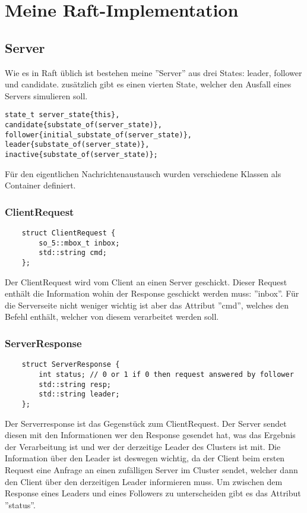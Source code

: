 \chapter{Meine Raft-Implementation}

\vspace{10mm}

\section{Server}
Wie es in Raft üblich ist bestehen meine ''Server'' aus drei States: leader, follower und candidate.
zusätzlich gibt es einen vierten State, welcher den Ausfall eines Servers simulieren soll.

\begin{verbatim}
state_t server_state{this},
candidate{substate_of(server_state)},
follower{initial_substate_of(server_state)},
leader{substate_of(server_state)},
inactive{substate_of(server_state)};
\end{verbatim}

Für den eigentlichen Nachrichtenaustausch wurden verschiedene Klassen als Container definiert.

\subsection{ClientRequest}
\begin{verbatim}
    struct ClientRequest {
        so_5::mbox_t inbox;
        std::string cmd;
    };
\end{verbatim}
Der ClientRequest wird vom Client an einen Server geschickt. Dieser Request enthält die Information
wohin der Response geschickt werden muss: ''inbox''. Für die Serverseite nicht weniger wichtig ist
aber das Attribut ''cmd'', welches den Befehl enthält, welcher von diesem verarbeitet werden soll.

\subsection{ServerResponse}
\begin{verbatim}
    struct ServerResponse {
        int status; // 0 or 1 if 0 then request answered by follower
        std::string resp;
        std::string leader;
    };
\end{verbatim}
Der Serverresponse ist das Gegenstück zum ClientRequest. Der Server sendet diesen mit den  Informationen
wer den Response gesendet hat, was das Ergebnis der Verarbeitung ist und wer der derzeitige Leader des 
Clusters ist mit. Die Information über den Leader ist deswegen wichtig, da der Client beim ersten Request
eine Anfrage an einen zufälligen Server im Cluster sendet, welcher dann den Client über den derzeitigen
Leader informieren muss. Um zwischen dem Response eines Leaders und eines Followers zu unterscheiden gibt
es das Attribut ''status''.

